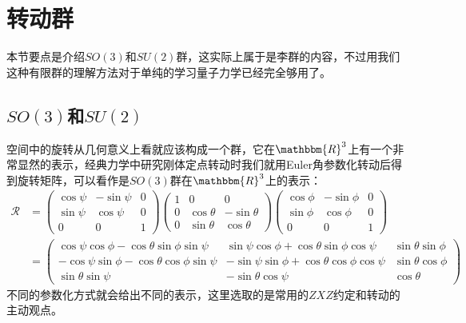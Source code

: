 \section{转动群}
本节要点是介绍$SO(3)$和$SU(2)$群，这实际上属于是李群的内容，不过用我们这种有限群的理解方法对于单纯的学习量子力学已经完全够用了。
\subsection{$SO(3)$和$SU(2)$}
空间中的旋转从几何意义上看就应该构成一个群，它在$\mathbbm{R}^3$上有一个非常显然的表示，经典力学中研究刚体定点转动时我们就用Euler角参数化转动后得到旋转矩阵，可以看作是$SO(3)$群在$\mathbbm{R}^3$上的表示：
\begin{equation}
	\label{eq:D.4.27}
	\begin{aligned}
		\mathcal{R}&=\left( {\begin{array}{*{20}{c}}
				{\cos \psi }&{ - \sin \psi }&0 \\ 
				{\sin \psi }&{\cos \psi }&0 \\ 
				0&0&1 
		\end{array}} \right)\left( {\begin{array}{*{20}{c}}
				1&0&0 \\ 
				0&{\cos \theta }&{ - \sin \theta } \\ 
				0&{\sin \theta }&{\cos \theta } 
		\end{array}} \right)\left( {\begin{array}{*{20}{c}}
				{\cos \phi }&{ - \sin \phi }&0 \\ 
				{\sin \phi }&{\cos \phi }&0 \\ 
				0&0&1 
		\end{array}} \right)\\
	&=\left( {\begin{array}{*{20}{c}}
			{\cos \psi \cos \phi  - \cos \theta \sin \phi \sin \psi }&{\sin \psi \cos \phi  + \cos \theta \sin \phi \cos \psi }&{\sin \theta \sin \phi } \\ 
			{ - \cos \psi \sin \phi  - \cos \theta \cos \phi \sin \psi }&{ - \sin \psi \sin \phi  + \cos \theta \cos \phi \cos \psi }&{\sin \theta \cos \phi } \\ 
			{\sin \theta \sin \psi }&{ - \sin \theta \cos \psi }&{\cos \theta } 
	\end{array}} \right)
	\end{aligned}
\end{equation}
不同的参数化方式就会给出不同的表示，这里选取的是常用的$ZXZ$约定和转动的主动观点。

